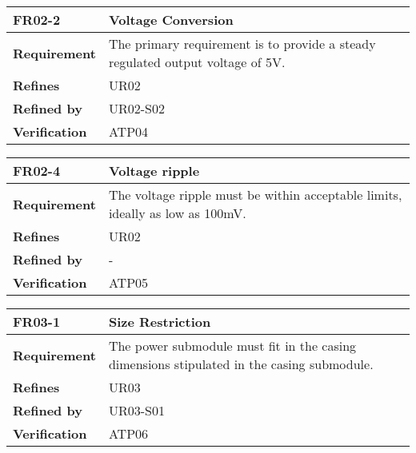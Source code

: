 \documentclass[class=report,11pt,crop=false]{standalone}
\begin{document}
 

\begin{table}
\centering

\begin{tabular}{| l | l |}
\hline
\textbf{FR02-2} & \textbf{Voltage Conversion} \\
\hline
\textbf{Requirement} & The primary requirement is to provide a steady regulated output voltage of 5V. \\
\hline
\textbf{Refines} & UR02 \\
\hline
\textbf{Refined by} & UR02-S02 \\
\hline
\textbf{Verification} & ATP04 \\
\hline

\end{tabular}

\end{table}

 

\begin{table}
\centering

\begin{tabular}{| l | l |}
\hline
\textbf{FR02-4} & \textbf{Voltage ripple} \\
\hline
\textbf{Requirement} & The voltage ripple must be within acceptable limits, ideally as low as 100mV. \\
\hline
\textbf{Refines} & UR02 \\
\hline
\textbf{Refined by} & - \\
\hline
\textbf{Verification} & ATP05 \\
\hline

\end{tabular}

\end{table}

 

\begin{table}
\centering

\begin{tabular}{| l | l |}
\hline
\textbf{FR03-1} & \textbf{Size Restriction} \\
\hline
\textbf{Requirement} & The power submodule must fit in the casing dimensions stipulated in the casing submodule. \\
\hline
\textbf{Refines} & UR03 \\
\hline
\textbf{Refined by} & UR03-S01 \\
\hline
\textbf{Verification} & ATP06 \\
\hline

\end{tabular}

\end{table}
\end{document}
